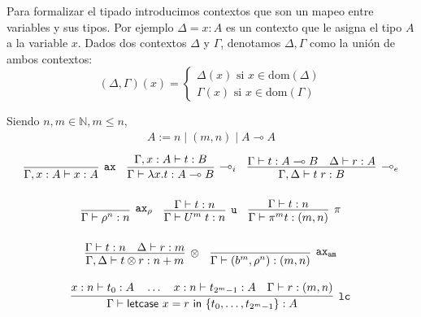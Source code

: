 Para formalizar el tipado introducimos contextos que son un mapeo entre variables y sus tipos. Por ejemplo $\Delta = x:A$ es un contexto que le asigna el tipo $A$ a la variable $x$. Dados dos contextos $\Delta$ y $\Gamma$, denotamos \emph{$\Delta,\Gamma$} como la unión de ambos contextos:
\[
(\Delta,\Gamma)(x) = \begin{cases}
    \Delta(x) \text{ si } x\in\mathrm{dom}(\Delta) \\
    \Gamma(x) \text{ si } x\in\mathrm{dom}(\Gamma)
\end{cases}
\]

\begin{definicion}
\label{def:tipado_lambda}

Siendo $n,m \in \mathbb{N}, m\leq n$,
\begin{align*}
A := n \mid (m, n) \mid A \multimap A
\end{align*}
 \[\arraycolsep=5pt\def\arraystretch{2.6}
   \begin{array}{ccc}
     \infer[\mathtt{ax}]
     {\Gamma, x : A \vdash x : A}
     {}
     &
         \infer[\multimap_i]
         {\Gamma \vdash \lambda x.t : A \multimap B}
         {\Gamma, x : A \vdash t : B}
     &
         \infer[\multimap_e]
         {\Gamma, \Delta \vdash t\;r : B}
         {\Gamma \vdash t : A \multimap B \quad \Delta \vdash r : A}
   \end{array}
 \]
 \[\arraycolsep=5pt\def\arraystretch{2.6}
   \begin{array}{ccc}
     \infer[\mathtt{ax}_\rho]
     {\Gamma \vdash \rho^n : n}
     {}
     &
         \infer[\mathtt{u}]
         {\Gamma \vdash U^m\;t : n}
         {\Gamma \vdash t : n}
     &
         \infer[\pi]
         {\Gamma \vdash \pi^m t : (m, n)}
         {\Gamma \vdash t : n}
   \end{array} 
 \]
 \[\arraycolsep=5pt\def\arraystretch{2.6}
   \begin{array}{cc}
     \infer[\otimes]
     {\Gamma, \Delta \vdash t \otimes r : n + m}
     {\Gamma \vdash t: n \quad \Delta \vdash r : m}
     &
         \infer[\mathtt{ax_{am}}]
         {\Gamma \vdash (b^m, \rho^n) : (m, n)}
         {}
   \end{array}
 \]
 \[\arraycolsep=5pt\def\arraystretch{2.6}
   \begin{array}{c}
     \infer[\mathtt{lc}]
     {\Gamma \vdash \textsf{letcase } x = r \textsf{ in  }\{t_0,\dots,t_{2^m-1}\} : A}
     {x:n\vdash t_0 : A \quad \dots\quad x:n\vdash t_{2^m-1}:A\quad \Gamma \vdash r:(m, n)}
   \end{array}
 \]

\end{definicion}

